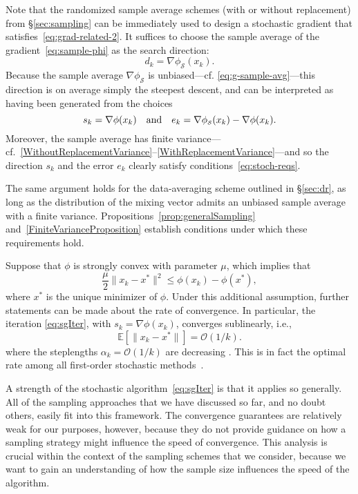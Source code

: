 \documentclass[nospthms]{svjour3}
\numberwithin{equation}{section}
\def\norm#1{\|#1\|}
\def\text #1{\hbox{\quad#1\quad}}
\def\k{_k}
\def\xstar{x^*}
\def\Oscr{\mathcal{O}}
\def\Sscr{\mathcal{S}}
\def\expval{\mathbb{E}}
\def\sample{\Sscr}
\def\phis{\phi_{\scriptscriptstyle\sample}}
\begin{document}
Note that the randomized sample average schemes (with or without
replacement) from \S\ref{sec:sampling} can be immediately used to
design a stochastic gradient that
satisfies~\eqref{eq:grad-related-2}. It suffices to choose the sample
average of the gradient~\eqref{eq:sample-phi} as the search direction:
\[
d\k = \nabla{\phis}(x\k).
\]
Because the sample average $\nabla\phis$ is
unbiased---cf. \eqref{eq:g-sample-avg}---this direction is on average
simply the steepest descent, and can be interpreted as having been
generated from the choices
\[
s\k = \nabla\phi(x\k) \text{and} e\k = \nabla\phis(x\k) - \nabla\phi(x\k).
\]
Moreover, the sample average has finite
variance---cf.~\eqref{WithoutReplacementVariance}--\eqref{WithReplacementVariance}---and
so the direction $s\k$ and the error $e\k$ clearly satisfy
conditions~\eqref{eq:stoch-reqs}.

The same argument holds for the data-averaging scheme outlined in
\S\ref{sec:dr}, as long as the distribution of the mixing vector
admits an unbiased sample average with a finite
variance. Propositions~\ref{prop:generalSampling}
and~\ref{FiniteVarianceProposition} establish conditions under which
these requirements hold.

Suppose that $\phi$ is strongly
convex with parameter $\mu$, which implies that
\begin{equation*}
 \frac{\mu}2\norm{x\k-\xstar}^2 \le \phi(x\k) - \phi(\xstar),
\end{equation*}
where $\xstar$ is the unique minimizer of $\phi$. Under this
additional assumption, further statements can be made about the rate
of convergence. In particular, the iteration \eqref{eq:sgIter}, with
$s\k=\nabla\phi(x\k)$, converges sublinearly, i.e.,
\begin{equation}\label{eq:9}
  \expval[\norm{x\k - \xstar}] = \Oscr(1/k).
\end{equation}
where the steplengths $\alpha\k=\Oscr(1/k)$ are decreasing
\cite[\S2.1]{nemirovski2009robust}. This is in fact the optimal rate
among all first-order stochastic
methods~\cite[\S14.1]{nemirovski1994efficient}.

A strength of the stochastic algorithm~\eqref{eq:sgIter} is that it
applies so generally. All of the sampling approaches that we have
discussed so far, and no doubt others, easily fit into this
framework. The convergence guarantees are relatively weak for our
purposes, however, because they do not provide guidance on how a
sampling strategy might influence the speed of convergence. This
analysis is crucial within the context of the sampling schemes that we
consider, because we want to gain an understanding of how the sample
size influences the speed of the algorithm.
\end{document}
